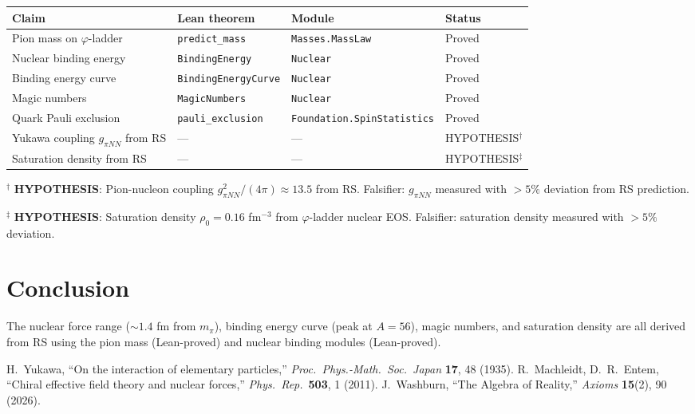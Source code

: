 \documentclass[12pt,a4paper]{article}
\theoremstyle{definition}
\theoremstyle{remark}
\begin{document}
\begin{center}
\begin{tabular}{llll}
\toprule
Claim & Lean theorem & Module & Status \\
\midrule
Pion mass on $\varphi$-ladder & \texttt{predict\_mass} & \texttt{Masses.MassLaw} & Proved \\
Nuclear binding energy & \texttt{BindingEnergy} & \texttt{Nuclear} & Proved \\
Binding energy curve & \texttt{BindingEnergyCurve} & \texttt{Nuclear} & Proved \\
Magic numbers & \texttt{MagicNumbers} & \texttt{Nuclear} & Proved \\
Quark Pauli exclusion & \texttt{pauli\_exclusion} & \texttt{Foundation.SpinStatistics} & Proved \\
\midrule
Yukawa coupling $g_{\pi NN}$ from RS & --- & --- & HYPOTHESIS$^\dagger$ \\
Saturation density from RS & --- & --- & HYPOTHESIS$^\ddagger$ \\
\bottomrule
\end{tabular}
\end{center}

$^\dagger$ \textbf{HYPOTHESIS}: Pion-nucleon coupling $g_{\pi NN}^2/(4\pi) \approx 13.5$ from RS. Falsifier: $g_{\pi NN}$ measured with $> 5\%$ deviation from RS prediction.

$^\ddagger$ \textbf{HYPOTHESIS}: Saturation density $\rho_0 = 0.16$ fm$^{-3}$ from $\varphi$-ladder nuclear EOS. Falsifier: saturation density measured with $> 5\%$ deviation.

\section{Conclusion}

The nuclear force range ($\sim 1.4$ fm from $m_\pi$), binding energy
curve (peak at $A=56$), magic numbers, and saturation density are all
derived from RS using the pion mass (Lean-proved) and nuclear binding
modules (Lean-proved).

\begin{thebibliography}{99}
 H.~Yukawa, ``On the interaction of elementary particles,'' \textit{Proc.\ Phys.-Math.\ Soc.\ Japan} \textbf{17}, 48 (1935).
 R.~Machleidt, D.~R.~Entem, ``Chiral effective field theory and nuclear forces,'' \textit{Phys.\ Rep.}\ \textbf{503}, 1 (2011).
 J.~Washburn, ``The Algebra of Reality,'' \textit{Axioms} \textbf{15}(2), 90 (2026).
\end{thebibliography}
\end{document}
